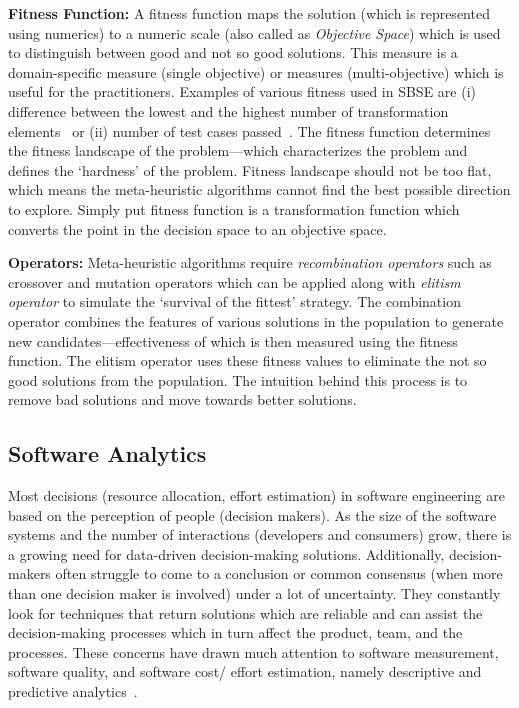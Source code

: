 \documentclass[table, xcdraw, sigconf,review, anonymous]{acmart}
\begin{document}
\noindent\textbf{Fitness Function: } A fitness function maps the solution (which is represented using numerics) to a numeric scale (also called as \textit{Objective Space}) which is used to distinguish between good and not so good solutions. This measure is a domain-specific measure (single objective) or measures (multi-objective) which is useful for the practitioners. Examples of various fitness used in SBSE are (i) difference between the lowest
and the highest number of transformation elements~\cite{fleck2017model} or (ii) number of test cases passed~\cite{oliveira2016improved}. The fitness function determines the fitness landscape of the problem---which characterizes the problem and defines the `hardness' of the problem. Fitness landscape should not be too flat, which means the meta-heuristic algorithms cannot find the best possible direction to explore. Simply put fitness function is a transformation function which converts the point in the decision space to an objective space. 

\noindent\textbf{Operators: } Meta-heuristic algorithms require \textit{recombination operators} such as crossover and mutation operators which can be applied along with \textit{elitism operator} to simulate the `survival of the fittest' strategy. The combination operator combines the features of various solutions in the population to generate new candidates---effectiveness of which is then measured using the fitness function. The elitism operator uses these fitness values to eliminate the not so good solutions from the population. The intuition behind this process is to remove bad solutions and move towards better solutions. 



\subsection{Software Analytics}\label{sec:MSR}
Most decisions (resource allocation, effort estimation) in software engineering are based on the perception of people (decision makers). As the size of the software systems and the number of interactions (developers and consumers) grow, there is a growing need for data-driven decision-making solutions. Additionally, decision-makers often struggle to come to a conclusion or common consensus (when more than one decision maker is involved) under a lot of uncertainty. They constantly look for techniques that return solutions which are reliable and can assist the decision-making processes which in turn affect the product, team, and the processes. These concerns have drawn much attention to software measurement, software quality, and software cost/ effort estimation, namely descriptive and predictive analytics~\cite{bener2015lessons}. 
\end{document}
